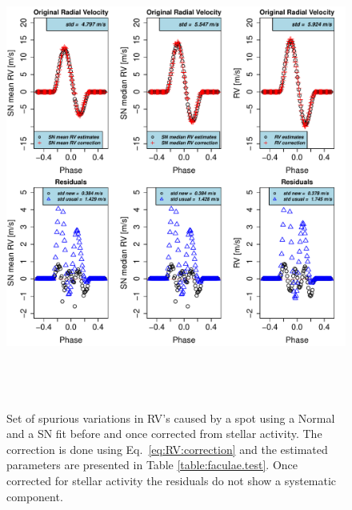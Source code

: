 \documentclass{aa}
\begin{document}
\begin{figure}[htbp]
   \centering
\includegraphics[height = 6in]{Spot_NEW_CORRECTION_[3]CorrectionActivity_RadialVelocity_vs_time.pdf} 
   \caption{Set of  spurious variations in RV's caused by a spot using a Normal and a SN fit before and once corrected from stellar activity. The correction is done using Eq.~\ref{eq:RV:correction} and the estimated parameters are presented in Table \ref{table:faculae.test}. Once corrected for stellar activity the residuals do not show a systematic component.}
    \label{fig:spot.correction}
\end{figure}
\end{document}
